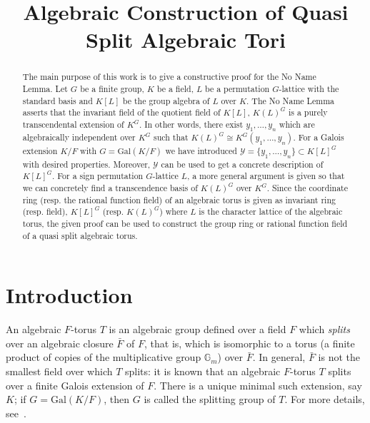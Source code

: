 \documentclass[12pt]{article}
\title{Algebraic Construction of Quasi Split Algebraic Tori}
\author{}
\theoremstyle{plain}
\begin{document}
\maketitle


\begin{abstract}

The main purpose of this work is to give a constructive proof for the No Name Lemma. Let $G$ be a finite group, $K$ be a field, $L$ be a permutation $G$-lattice with the standard basis and $K[L]$ be the group algebra of $L$ over $K$. The No Name Lemma asserts that the invariant field of the quotient field of $K[L]$, $K(L)^G$ is a purely transcendental extension of $K^G$. In other words, there exist $y_1, \ldots , y_n$ which are algebraically independent over $K^G$ such that $K(L)^G \cong K^G(y_1, \ldots , y_n)$. For a Galois extension $K/F$ with $G = \mathrm{Gal}(K/F)$ we have introduced $\mathcal{Y}=\lbrace y_1, \ldots, y_n \rbrace \subset K[L]^G$ with desired properties. Moreover, $\mathcal{Y}$ can be used to get a concrete description of $K[L]^G$. For a sign permutation $G$-lattice $L$, a more general argument is given so that we can concretely find a transcendence basis of $K(L)^G$ over $K^G$. Since the coordinate ring (resp. the rational function field) of an algebraic torus is given as invariant ring (resp. field), $K[L]^G$ (resp. $K(L)^G$) where $L$ is the character lattice of the algebraic torus, the given proof can be used to construct the group ring or rational function field of a quasi split algebraic torus.
\end{abstract}

\section{Introduction}



An algebraic $F$-torus $T$ is an algebraic group defined over a field
$F$ which {\em splits} over an algebraic closure $\bar F$ of $F$, that
is, which is isomorphic to a torus (a finite product of copies of the
multiplicative group $\mathbb{G}_m$) over $\bar{F}$. In general,
$\bar{F}$ is not the smallest field over which $T$ splits: it is known
that an algebraic $F$-torus $T$ splits over a finite Galois extension
of $F$. There is a unique minimal such extension, say $K$; if $G =
\mathrm{Gal}(K/F)$, then $G$ is called the splitting group of $T$. For
more details, see~\cite[Chapter 2]{Voskresenskii}.
\end{document}
